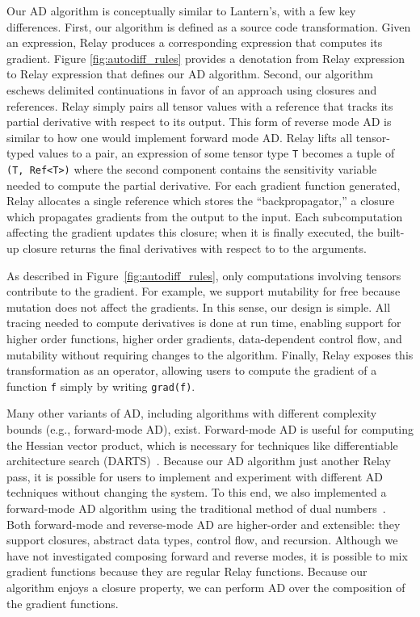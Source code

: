 Our AD algorithm is conceptually similar to Lantern's,
  with a few key differences.
First, our algorithm is defined as a source code
  transformation.
Given an expression, Relay produces a corresponding
  expression that computes its gradient.
Figure \ref{fig:autodiff_rules} provides a denotation from
  Relay expression to Relay expression that defines our
  AD algorithm.
Second, our algorithm eschews delimited continuations in favor of
  an approach using closures and references.
Relay simply pairs all tensor values with a reference
  that tracks its partial derivative with respect to its
  output.
This form of reverse mode AD is similar to how one
  would implement forward mode AD.
Relay lifts all tensor-typed values to a pair,
  an expression of some tensor type \verb|T| becomes a tuple of \verb|(T, Ref<T>)|
  where the second component contains the sensitivity variable
  needed to compute the partial derivative.
For each gradient function generated, Relay allocates
  a single reference which stores the ``backpropagator,''
  a closure which propagates gradients from the output to the input.
Each subcomputation affecting the gradient updates this closure; when it is
  finally executed, the built-up closure returns the final derivatives with respect to
  to the arguments.

As described in Figure~\ref{fig:autodiff_rules}, only
  computations involving tensors contribute to the gradient.
For example, we support mutability for free because mutation
  does not affect the gradients.
In this sense, our design is simple.
All tracing needed to compute derivatives is done at run time, enabling
  support for higher order functions, higher order gradients,
  data-dependent control flow, and mutability without requiring changes
  to the algorithm.
Finally, Relay exposes this transformation as an operator, allowing users
  to compute the gradient of a function \verb|f| simply by writing \verb|grad(f)|.

Many other variants of AD, including algorithms with different
  complexity bounds (e.g., forward-mode AD), exist.
Forward-mode AD is useful for computing the
  Hessian vector product, which is necessary for techniques like differentiable architecture search
  (DARTS)~\citep{darts}.
Because our AD algorithm just another Relay pass,
  it is possible for users to implement and experiment with different
  AD techniques without changing the system.
To this end, we also implemented a  forward-mode AD algorithm using the traditional method of dual
  numbers~\citep{ad_survey}.
Both forward-mode and reverse-mode AD are higher-order and extensible: they
  support closures, abstract data types, control flow, and recursion.
Although we have not investigated
  composing forward and reverse modes,
  it is possible to mix gradient functions
  because they are regular Relay functions.
Because our algorithm enjoys a closure property,
  we can perform AD over the composition of the gradient
  functions.

